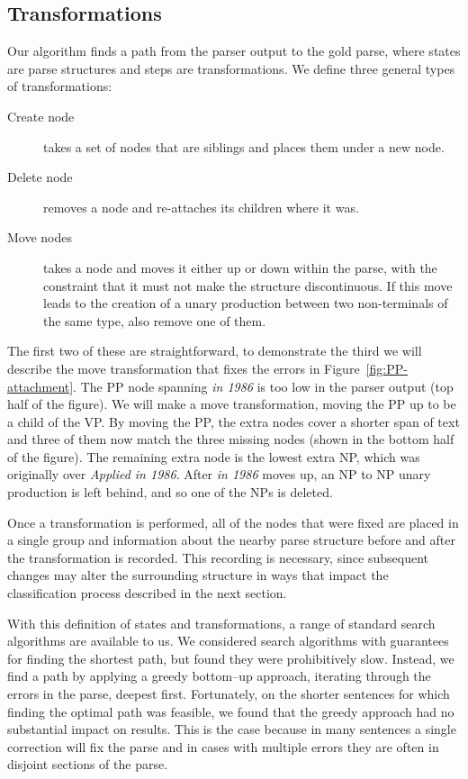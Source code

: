 \subsection{Transformations} \label{sec:tree-transform}

Our algorithm finds a path from the parser output to the gold parse, where states are parse structures and steps are transformations.
We define three general types of transformations:

\begin{description}
  \item[Create node] takes a set of nodes that are siblings and places them under a new node.
  \item[Delete node] removes a node and re-attaches its children where it was.
  \item[Move nodes] takes a node and moves it either up or down within the parse, with the constraint that it must not make the structure discontinuous. If this move leads to the creation of a unary production between two non-terminals of the same type, also remove one of them.
\end{description}

The first two of these are straightforward, to demonstrate the third we will describe the move transformation that fixes the errors in Figure~\ref{fig:PP-attachment}.
The PP node spanning \emph{in 1986} is too low in the parser output (top half of the figure).
We will make a move transformation, moving the PP up to be a child of the VP.
By moving the PP, the extra nodes cover a shorter span of text and three of them now match the three missing nodes (shown in the bottom half of the figure).
The remaining extra node is the lowest extra NP, which was originally over \emph{Applied in 1986}.
After \emph{in 1986} moves up, an NP to NP unary production is left behind, and so one of the NPs is deleted.

Once a transformation is performed, all of the nodes that were fixed are placed in a single group and information about the nearby parse structure before and after the transformation is recorded.
This recording is necessary, since subsequent changes may alter the surrounding structure in ways that impact the classification process described in the next section.

With this definition of states and transformations, a range of standard search algorithms are available to us.
We considered search algorithms with guarantees for finding the shortest path, but found they were prohibitively slow.
Instead, we find a path by applying a greedy bottom--up approach, iterating through the errors in the parse, deepest first.
Fortunately, on the shorter sentences for which finding the optimal path was feasible, we found that the greedy approach had no substantial impact on results.
This is the case because in many sentences a single correction will fix the parse and in cases with multiple errors they are often in disjoint sections of the parse.

